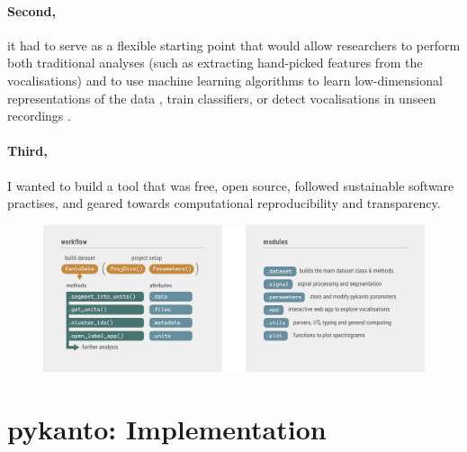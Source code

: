 \paragraph{Second,} it had to serve as a flexible starting point that would allow researchers to perform both traditional analyses (such as extracting hand-picked
features from the vocalisations) and to use machine learning algorithms to learn
low-dimensional representations of the data \parencite{goffinet2021, kollmorgen2020,
morfi2021, sainburg2020}, train classifiers, or detect vocalisations in unseen
recordings \parencite{cohen2022, kahl2021, stowell2014}.

\paragraph{Third,} I wanted to build a tool that was free, open source, followed
sustainable software practises, and geared towards computational
reproducibility and transparency.

\begin{figure}[bh!]
    \centering
    \includegraphics[width=\textwidth]{figures/chapter_2/fig2.pdf}
    \label{fig:structure}
\end{figure}

\section{pykanto: Implementation}

